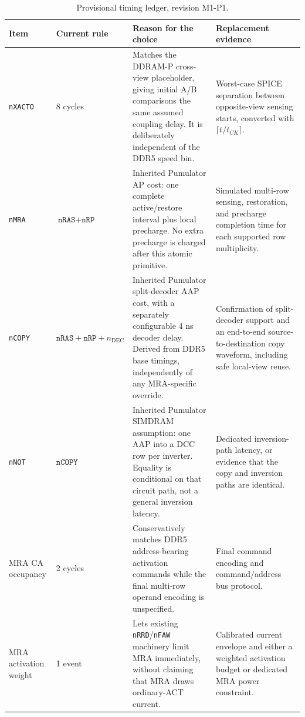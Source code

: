 \documentclass[9pt,twocolumn]{extarticle}
\newcommand{\param}[1]{\texttt{#1}}
\newcommand{\timingrevision}{M1-P1}
\begin{document}
\begin{table}[t]
\centering
\caption{Provisional timing ledger, revision \timingrevision{}.}
\label{tab:timing-ledger}
\begin{tabularx}{\textwidth}{@{}p{}p{}X X@{}}
\toprule
Item & Current rule & Reason for the choice & Replacement evidence \\
\midrule
\param{nXACTO} & 8 cycles & Matches the DDRAM-P cross-view placeholder, giving initial A/B comparisons the same assumed coupling delay. It is deliberately independent of the DDR5 speed bin. & Worst-case SPICE separation between opposite-view sensing starts, converted with $\lceil t/t_{CK}\rceil$. \\
\param{nMRA} & $\param{nRAS}+\param{nRP}$ & Inherited Pumulator AP cost: one complete active/restore interval plus local precharge. No extra precharge is charged after this atomic primitive. & Simulated multi-row sensing, restoration, and precharge completion time for each supported row multiplicity. \\
\param{nCOPY} & $\param{nRAS}+\param{nRP}+n_{\mathrm{DEC}}$ & Inherited Pumulator split-decoder AAP cost, with a separately configurable 4 ns decoder delay. Derived from DDR5 base timings, independently of any MRA-specific override. & Confirmation of split-decoder support and an end-to-end source-to-destination copy waveform, including safe local-view reuse. \\
\param{nNOT} & $\param{nCOPY}$ & Inherited Pumulator SIMDRAM assumption: one AAP into a DCC row per inverter. Equality is conditional on that circuit path, not a general inversion latency. & Dedicated inversion-path latency, or evidence that the copy and inversion paths are identical. \\
MRA CA occupancy & 2 cycles & Conservatively matches DDR5 address-bearing activation commands while the final multi-row operand encoding is unspecified. & Final command encoding and command/address bus protocol. \\
MRA activation weight & 1 event & Lets existing \param{nRRD}/\param{nFAW} machinery limit MRA immediately, without claiming that MRA draws ordinary-ACT current. & Calibrated current envelope and either a weighted activation budget or dedicated MRA power constraint. \\
\bottomrule
\end{tabularx}
\end{table}
\end{document}
